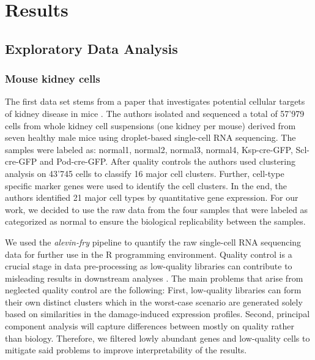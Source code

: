 

\chapter{Results}

\section{Exploratory Data Analysis}

\subsection{Mouse kidney cells}
The first data set stems from a paper that investigates potential cellular targets of kidney disease in mice \citep{mouse_cells}. The authors isolated and sequenced a total of 57'979 cells from whole kidney cell suspensions (one kidney per mouse) derived from seven healthy male mice using droplet-based single-cell RNA sequencing. The samples were labeled as: normal1, normal2, normal3, normal4, Ksp-cre-GFP, Scl-cre-GFP and Pod-cre-GFP. After quality controls the authors used clustering analysis on 43'745 cells to classify 16 major cell clusters. Further, cell-type specific marker genes were used to identify the cell clusters. In the end, the authors identified 21 major cell types by quantitative gene expression. For our work, we decided to use the raw data from the four samples that were labeled as categorized as normal to ensure the biological replicability between the samples.

We used the \emph{alevin-fry} pipeline to quantify the raw single-cell RNA sequencing data for further use in the R programming environment. Quality control is a crucial stage in data pre-processing as low-quality libraries can contribute to misleading results in downstream analyses \citep{OSCA}. The main problems that arise from neglected quality control are the following: First, low-quality libraries can form their own distinct clusters which in the worst-case scenario are generated solely based on similarities in the damage-induced expression profiles. Second, principal component analysis will capture differences between mostly on quality rather than biology. Therefore, we filtered lowly abundant genes and low-quality cells to mitigate said problems to improve interpretability of the results. 


